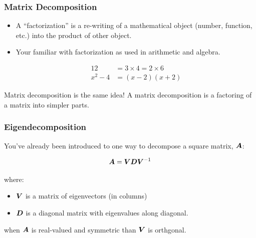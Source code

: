 \documentclass{beamer}
\begin{document}
\begin{frame}[fragile]
  \frametitle{Matrix Decomposition}

\begin{itemize}
\item A ``factorization'' is a re-writing of a mathematical object (number, function, etc.) into the product of other object.

\item Your familiar with factorization as used in arithmetic and algebra.

\begin{align*}
12 &= 3 \times 4 = 2 \times 6  \\
x^2 - 4 &= (x-2)(x+2)
\end{align*}

\end{itemize}




\begin{center}
 \alert{Matrix decomposition is the same idea! A matrix decomposition is a factoring of a matrix into simpler parts.}
\end{center}




\end{frame}



\begin{frame}
  \frametitle{Eigendecomposition}


You've already been introduced to one way to decompose a square matrix, $\bm{A}$:

$$ \bm{A} = \bm{V}\bm{D}\bm{V}^{-1} $$

where:
\begin{itemize}
\item  $\bm{V}$ is a matrix of eigenvectors (in columns)
\item $\bm{D}$ is a diagonal matrix with eigenvalues along diagonal.
\end{itemize}

\medskip
when $\bm{A}$ is real-valued and symmetric than $\bm{V}$ is orthgonal.

\end{frame}
\end{document}
